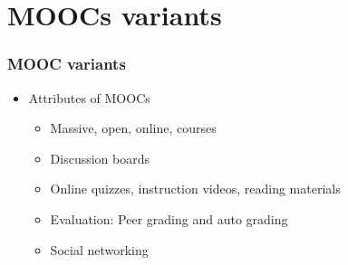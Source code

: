 \documentclass[13pt]{beamer}
\begin{document}
\section{MOOCs variants}
\begin{frame}
	\frametitle{MOOC variants}
	\begin{itemize}
	  \item Attributes of MOOCs
	  \begin{itemize}
		\item Massive, open, online, courses
		\item Discussion boards
		\item Online quizzes, instruction videos, reading materials
		\item Evaluation: Peer grading and auto grading
		\item Social networking 
	  \end{itemize}
	\end{itemize}
\end{frame}
\end{document}
